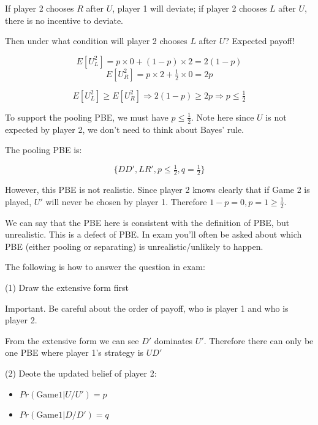 \documentclass{article}
\begin{document}
\begin{mdframed}[backgroundcolor=blue!20,linecolor=white]
\medskip

If player 2 chooses $R$ after $U$, player 1 will deviate; if player 2 chooses $L$ after $U$, there is no incentive to deviate.

\medskip

Then under what condition will player 2 chooses $L$ after $U$? Expected payoff!

$$E[U^2_{L}] = p \times 0+ (1-p)\times 2 = 2(1-p)$$
$$E[U^2_{R}] = p \times 2+ \tfrac12 \times 0 = 2p$$

$$E[U^2_{L}] \ge E[U^2_{R}] \Rightarrow 2(1-p) \ge 2p \Rightarrow p \le \tfrac12$$

To support the pooling PBE, we must have $p \le \tfrac12$.
Note here since $U$ is not expected by player 2, we don't need to think about Bayes' rule.

\medskip

The pooling PBE is:

$$\{DD', LR', p \le \tfrac12, q = \tfrac12\}$$

However, this PBE is not realistic. Since player 2 knows clearly that if Game 2 is played, $U'$ will never be chosen by player 1. Therefore $1-p = 0, p =1 \ge \tfrac12$.

\medskip

We can say that the PBE here is consistent with the definition of PBE, but unrealistic. This is a defect of PBE. In exam you'll often be asked about which PBE (either pooling or separating) is unrealistic/unlikely to happen.

\medskip

The following is how to answer the question in exam:
\end{mdframed}


(1) Draw the extensive form first

\begin{mdframed}[backgroundcolor=yellow!20,linecolor=white]
Important. Be careful about the order of payoff, who is player 1 and who is player 2.
\end{mdframed}

From the extensive form we can see $D'$ dominates $U'$.
Therefore there can only be one PBE where player 1's strategy is $UD'$

(2) Deote the updated belief of player 2:
\begin{itemize}
\item $Pr(\text{Game1} | U/U') = p$
\item $Pr(\text{Game1} | D/D') = q$
\end{itemize}
\end{document}
